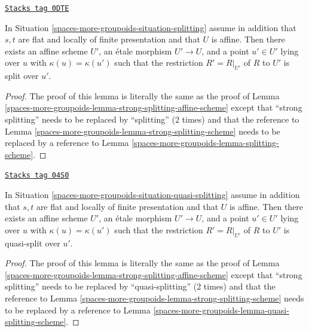 \begin{lemma}
\label{spaces-more-groupoids-lemma-splitting-affine-scheme}
\href{https://stacks.math.columbia.edu/tag/0DTE}{\texttt{Stacks tag 0DTE}}

In Situation \ref{spaces-more-groupoids-situation-splitting} assume in addition that
$s, t$ are flat and locally of finite presentation and that $U$ is affine.
Then there exists an affine scheme $U'$, an \'etale morphism
$U' \to U$, and a point $u' \in U'$ lying over $u$ with
$\kappa(u) = \kappa(u')$ such that the restriction $R' = R|_{U'}$ of
$R$ to $U'$ is split over $u'$.
\end{lemma}

\begin{proof}
The proof of this lemma is literally the same as the proof of
Lemma \ref{spaces-more-groupoids-lemma-strong-splitting-affine-scheme}
except that ``strong splitting'' needs to be replaced by ``splitting''
(2 times) and that the reference to
Lemma \ref{spaces-more-groupoids-lemma-strong-splitting-scheme}
needs to be replaced by a reference to
Lemma \ref{spaces-more-groupoids-lemma-splitting-scheme}.
\end{proof}

\begin{lemma}
\label{spaces-more-groupoids-lemma-quasi-splitting-affine-scheme}
\href{https://stacks.math.columbia.edu/tag/04S0}{\texttt{Stacks tag 04S0}}

In Situation \ref{spaces-more-groupoids-situation-quasi-splitting} assume in addition that
$s, t$ are flat and locally of finite presentation and that $U$ is affine.
Then there exists an affine scheme $U'$, an \'etale morphism
$U' \to U$, and a point $u' \in U'$ lying over $u$ with
$\kappa(u) = \kappa(u')$ such that the restriction $R' = R|_{U'}$ of
$R$ to $U'$ is quasi-split over $u'$.
\end{lemma}

\begin{proof}
The proof of this lemma is literally the same as the proof of
Lemma \ref{spaces-more-groupoids-lemma-strong-splitting-affine-scheme}
except that ``strong splitting'' needs to be replaced by ``quasi-splitting''
(2 times) and that the reference to
Lemma \ref{spaces-more-groupoids-lemma-strong-splitting-scheme}
needs to be replaced by a reference to
Lemma \ref{spaces-more-groupoids-lemma-quasi-splitting-scheme}.
\end{proof}



